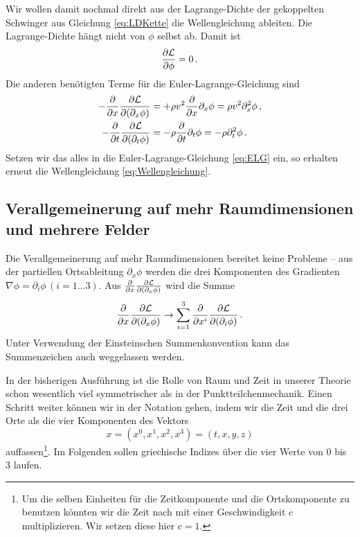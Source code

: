 \documentclass[paper=a4, fontsize=11.0pt, abstractoff, DIV12]{scrartcl}
\newcommand{\LD}{\ensuremath{\mathcal{L}}}
\begin{document}
Wir wollen damit nochmal direkt aus der Lagrange-Dichte der gekoppelten
Schwinger aus Gleichung \eqref{eq:LDKette} die Wellengleichung ableiten.
Die Lagrange-Dichte hängt nicht von $\phi$ selbst ab. Damit ist
\begin{equation}
\firstpderiv{\LD}{\phi} = 0\,.
\end{equation}
Die anderen benötigten Terme für die Euler-Lagrange-Gleichung sind
\begin{align}
-\firstpderiv{}{x}\firstpderiv{\LD}{(\partial_x\phi)} &= +\rho v^2 \firstpderiv{}{x}\partial_x\phi =\rho v^2 \partial_x^2\phi\,,\\
-\firstpderiv{}{t}\firstpderiv{\LD}{(\partial_t\phi)} &= -\rho \firstpderiv{}{t}\partial_t\phi = -\rho \partial_t^2\phi\,.
\end{align}
Setzen wir das alles in die Euler-Lagrange-Gleichung \eqref{eq:ELG} ein, so
erhalten erneut die Wellengleichung \eqref{eq:Wellengleichung}.

\subsection{Verallgemeinerung auf mehr Raumdimensionen und mehrere Felder}

Die Verallgemeinerung auf mehr Raumdimensionen bereitet keine Probleme --
aus der partiellen Ortsableitung $\partial_x\phi$ werden die drei
Komponenten des Gradienten $\nabla \phi = \partial_i\phi\,(i=1\dots3)$. Aus
$\firstpderiv{}{x}\firstpderiv{\LD}{(\partial_x\phi)}$ wird die Summe
\begin{equation}
\firstpderiv{}{x}\firstpderiv{\LD}{(\partial_x\phi)} \to \sum\limits_{i=1}^{3} \firstpderiv{}{x^i}\firstpderiv{\LD}{(\partial_i \phi)}\,.
\end{equation}
Unter Verwendung der Einsteinschen Summenkonvention kann das Summenzeichen
auch weggelassen werden.

In der bisherigen Ausführung ist die Rolle von Raum und Zeit in unserer
Theorie schon wesentlich viel symmetrischer als in der
Punktteilchenmechanik. Einen Schritt weiter können wir in der Notation
gehen, indem wir die Zeit und die drei Orte als die vier Komponenten des
Vektors
\begin{equation}
x = \left(x^0, x^1, x^2, x^3\right) = (t, x, y, z)
\end{equation}
auffassen\footnote{Um die selben Einheiten für die Zeitkomponente und die
Ortskomponente zu benutzen könnten wir die Zeit nach mit einer
Geschwindigkeit $c$ multiplizieren. Wir setzen diese hier $c=1$.}. Im
Folgenden sollen griechische Indizes über die vier Werte von $0$ bis $3$
laufen.
\end{document}

